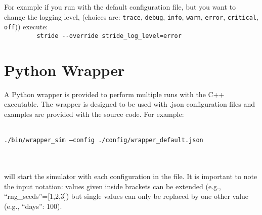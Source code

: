 For example if you run with the default configuration file, but you
want to change the logging level,
(choices are: \texttt{trace}, \texttt{debug}, \texttt{info}, \texttt{warn},
\texttt{error}, \texttt{critical}, \texttt{off})) execute:\\
\verb!         stride --override stride_log_level=error!


\section{Python Wrapper}
A Python wrapper is provided to perform multiple runs with the C++ executable.
The wrapper is designed to be used with .json configuration files and examples are provided with the source code.
For example: \\ \\
\centerline{\texttt{./bin/wrapper\_sim --config ./config/wrapper\_default.json}} \\ \\
will start the simulator with each configuration in the file.
It is important to note the input notation: values given inside brackets can be extended (e.g., ``rng\_seeds''=[1,2,3]) but single values can only be replaced by one other value (e.g., ``days'': 100).


